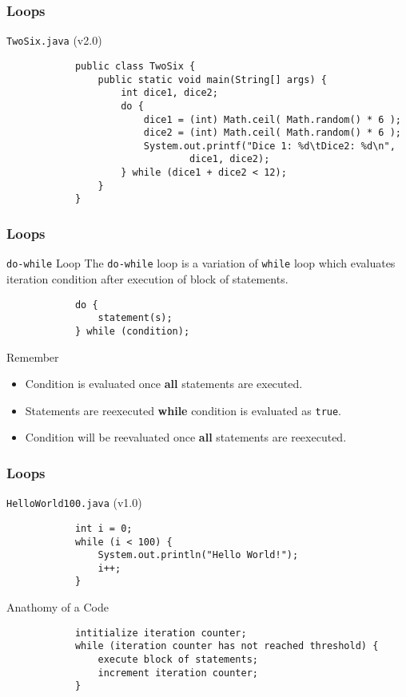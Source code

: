 \documentclass[10pt, compress]{beamer}
\begin{document}
\begin{frame}[fragile]
	\frametitle{Loops}
	\begin{block}{\texttt{TwoSix.java} (v2.0)}
		\begin{verbatim}
			public class TwoSix {
			    public static void main(String[] args) {
			        int dice1, dice2;
			        do {
			            dice1 = (int) Math.ceil( Math.random() * 6 );
			            dice2 = (int) Math.ceil( Math.random() * 6 );
			            System.out.printf("Dice 1: %d\tDice2: %d\n",
			                    dice1, dice2);
			        } while (dice1 + dice2 < 12);
			    }
			}
		\end{verbatim}
	\end{block}
\end{frame}

\begin{frame}[fragile]
	\frametitle{Loops}
	\begin{block}{\texttt{do-while} Loop}
		The \texttt{do-while} loop is a variation of \texttt{while} loop which evaluates iteration condition after execution of block of statements.
		\begin{verbatim}
			do {
			    statement(s);
			} while (condition);
		\end{verbatim}
	\end{block}
	\begin{block}{Remember}
		\begin{itemize}
			\item[] Condition is evaluated once \textbf{all} statements are executed.
			\item[] Statements are reexecuted \textbf{while} condition is evaluated as \texttt{true}.
			\item[] Condition will be reevaluated once \textbf{all} statements are reexecuted.
		\end{itemize}
	\end{block}
\end{frame}

\begin{frame}[fragile]
	\frametitle{Loops}
	\begin{block}{\texttt{HelloWorld100.java} (v1.0)}
		\begin{verbatim}
			int i = 0;
			while (i < 100) {
			    System.out.println("Hello World!");
			    i++;
			}
		\end{verbatim}
	\end{block}
	\begin{block}{Anathomy of a Code}
		\begin{verbatim}
			intitialize iteration counter;
			while (iteration counter has not reached threshold) {
			    execute block of statements;
			    increment iteration counter;
			}
		\end{verbatim}
	\end{block}
\end{frame}
\end{document}
